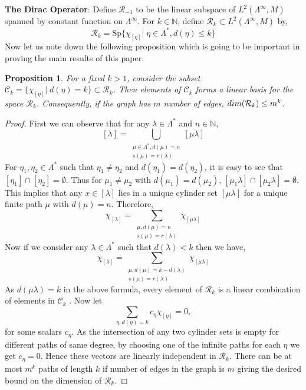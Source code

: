 \documentclass{amsart}
\theoremstyle{plain}
\newtheorem{proposition}[subsection]{Proposition}
\theoremstyle{definition}
\theoremstyle{remark}
\numberwithin{equation}{section}
\newcommand{\cal}{\mathcal}
\newcommand{\clr}{{\cal R}}
\begin{document}
\textbf{The Dirac Operator}: Define $\mathcal{R}_{-1}$ to be the linear subspace of $L^{2}(\Lambda^{\infty},M)$ spanned by constant function on $\Lambda^{\infty}$. For $k\in \mathbb{N}$, define $\mathcal{R}_{k}\subset L^{2}(\Lambda^{\infty},M) $ by, 
\begin{equation*}
    \mathcal{R}_{k}=\text{Sp}\{\chi_{[\eta]} |\; \eta\in \Lambda^{\ast}, d(\eta)\leq k\}
\end{equation*}
Now let us note down the following proposition which is going to be important in proving the main results of this paper.
\begin{proposition}
\label{R_kdim}
  For a fixed $k>1$, consider the subset $\mathcal{C}_{k}=\{\chi_{[\eta]}|\; d(\eta)=k\}\subset \mathcal{R}_{k}$. Then elements of $\mathcal{C}_{k}$ forms a linear basis for the space $\clr_{k}$. Consequently, if the graph has $m$ number of edges, ${\rm dim}(\clr_{k})\leq m^{k}$. 
\end{proposition}
\begin{proof}
First we can observe that for any $\lambda\in \Lambda^{\ast}$ and $n\in \mathbb{N}$,
$$[\lambda]=\bigcup \limits_{\substack{\mu\in \Lambda^{\ast}, d(\mu)=n\\ s(\mu)=r(\lambda)}}[\mu\lambda]$$ 
For $\eta_{1},\eta_{2}\in\Lambda^{\ast}$ such that $\eta_{1}\neq\eta_{2}$ and $d(\eta_{1})=d(\eta_{2})$, it is easy to see that $[\eta_{1}]\cap[\eta_{2}]=\emptyset$. Thus for $\mu_{1}\neq\mu_{2}$ with $d(\mu_{1})=d(\mu_{2})$, $[\mu_{1}\lambda]\cap[\mu_{2}\lambda]=\emptyset$. This implies that any $x\in[\lambda]$ lies in a unique cylinder set $[\mu\lambda]$ for a unique finite path $\mu$ with $d(\mu)=n$. Therefore, 
\begin{equation*}
\chi_{[\lambda]}=\sum\limits_{\substack{\mu,d(\mu)=n\\ s(\mu)=r(\lambda)}}\chi_{[\mu\lambda]}
\end{equation*}
Now if we consider any $\lambda\in \Lambda^{\ast}$ such that $d(\lambda)<k$ then we have, 
\begin{equation*}
\chi_{[\lambda]}=\sum\limits_{\substack{\mu,d(\mu)=k-d(\lambda)\\ s(\mu)=r(\lambda)}}\chi_{[\mu\lambda]}
\end{equation*}
As $d(\mu\lambda)=k$ in the above formula, every element of $\mathcal{R}_{k}$ is a linear combination of elements in $\mathcal{C}_{k}$
. Now let \begin{displaymath}\sum\limits_{\eta,d(\eta)=k}c_{\eta}\chi_{[\eta]}=0,\end{displaymath} for some scalars $c_{\eta}$. As the intersection of any two cylinder sets is empty for different paths of same degree, by choosing one of the infinite paths for each $\eta$ we get $c_{\eta}=0$. Hence these vectors are linearly independent in $\mathcal{R}_{k}$. There can be at most $m^{k}$ paths of length $k$ if number of edges in the graph is $m$ giving the desired bound on the dimension of $\clr_{k}$. \end{proof}
\end{document}

